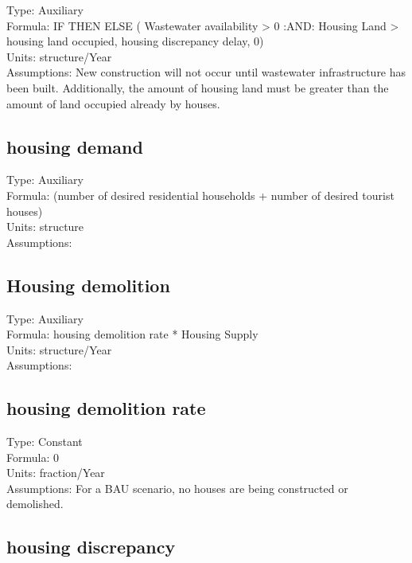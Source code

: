 \documentclass[
  11pt,
]{book}
\begin{document}
Type: Auxiliary\\
Formula: IF THEN ELSE ( Wastewater availability \textgreater{} 0 :AND: Housing Land \textgreater{} housing land occupied, housing discrepancy delay, 0)\\
Units: structure/Year\\
Assumptions: New construction will not occur until wastewater infrastructure has been built. Additionally, the amount of housing land must be greater than the amount of land occupied already by houses.

\hypertarget{housing-demand}{%
\subsection{housing demand}\label{housing-demand}}

Type: Auxiliary\\
Formula: (number of desired residential households + number of desired tourist houses)\\
Units: structure\\
Assumptions:

\hypertarget{housing-demolition}{%
\subsection{Housing demolition}\label{housing-demolition}}

Type: Auxiliary\\
Formula: housing demolition rate * Housing Supply\\
Units: structure/Year\\
Assumptions:

\hypertarget{housing-demolition-rate}{%
\subsection{housing demolition rate}\label{housing-demolition-rate}}

Type: Constant\\
Formula: 0\\
Units: fraction/Year\\
Assumptions: For a BAU scenario, no houses are being constructed or demolished.

\hypertarget{housing-discrepancy}{%
\subsection{housing discrepancy}\label{housing-discrepancy}}
\end{document}
